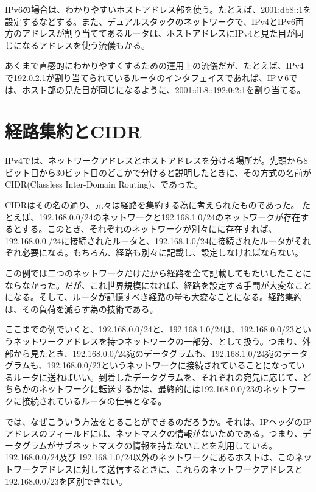 IPv6の場合は、わかりやすいホストアドレス部を使う。たとえば、2001:db8::1を設定するなどする。また、デュアルスタックのネットワークで、IPv4とIPv6両方のアドレスが割り当ててあるルータは、ホストアドレスにIPv4と見た目が同じになるアドレスを使う流儀もかる。

あくまで直感的にわかりやすくするための運用上の流儀だが、たとえば、IPv4で192.0.2.1が割り当てられているルータのインタフェイスであれば、IPｖ6では、ホスト部の見た目が同じになるように、2001:db8::192:0:2:1を割り当てる。

\section{経路集約とCIDR}

IPv4では、ネットワークアドレスとホストアドレスを分ける場所が。先頭から8ビット目から30ビット目のどこかで分けると説明したときに、その方式の名前が CIDR(Classless Inter-Domain Routing)、であった。

CIDRはその名の通り、元々は経路を集約する為に考えられたものであった。
たとえば、192.168.0.0/24のネットワークと192.168.1.0/24のネットワークが存在するとする。このとき、それぞれのネットワークが別々にに存在すれば、192.168.0.0./24に接続されたルータと、192.168.1.0/24に接続されたルータがそれぞれ必要になる。もちろん、経路も別々に記載し、設定しなければならない。

この例では二つのネットワークだけだから経路を全て記載してもたいしたことにならなかった。だが、これ世界規模になれば、経路を設定する手間が大変なことになる。そして、ルータが記憶すべき経路の量も大変なことになる。経路集約は、その負荷を減らす為の技術である。

ここまでの例でいくと、192.168.0.0/24と、192.168.1.0/24は、192.168.0.0/23というネットワークアドレスを持つネットワークの一部分、として扱う。つまり、外部から見たとき、192.168.0.0/24宛のデータグラムも、192.168.1.0/24宛のデータグラムも、192.168.0.0/23というネットワークに接続されていることになっているルータに送ればいい。到着したデータグラムを、それぞれの宛先に応じて、どちらかのネットワークに転送するかは、最終的には192.168.0.0/23のネットワークに接続されているルータの仕事となる。

では、なぜこういう方法をとることができるのだろうか。それは、IPヘッダのIPアドレスのフィールドには、ネットマスクの情報がないためである。つまり、データグラムがサブネットマスクの情報を持たないことを利用している。
192.168.0.0/24及び 192.168.1.0/24以外のネットワークにあるホストは、このネットワークアドレスに対して送信するときに、これらのネットワークアドレスと 192.168.0.0/23を区別できない。

